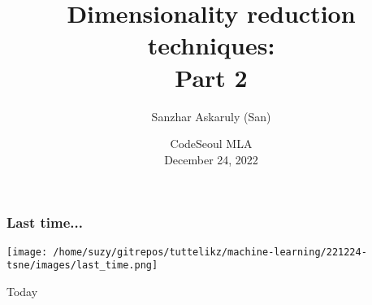\documentclass{beamer}
\title[CodeSeoul] %
  {Dimensionality reduction techniques: \\Part 2}
\author[Machine Learning Afternoons] %
  {Sanzhar Askaruly (San)}
\institute[] %
  { Ulsan National Institute of Science and Technology\newline
    Ph.D. Candidate in Biomedical Engineering}
\date[December 24]
{CodeSeoul MLA \\December 24, 2022}
\begin{document}
    \begin{frame}
    \titlepage %
    \end{frame}

    \begin{frame}
        \frametitle{Last time...}
        \begin{center}
            \texttt{[image: /home/suzy/gitrepos/tuttelikz/machine-learning/221224-tsne/images/last\_time.png]}
        \end{center}
    \end{frame}

    \begin{frame}{Today}
      \tableofcontents
    \end{frame}

    
\end{document}
